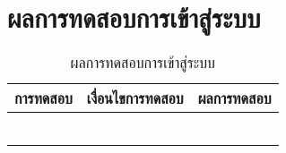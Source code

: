 \section{ผลการทดสอบการเข้าสู่ระบบ}
\begin{table}[H]
	\caption{ผลการทดสอบการเข้าสู่ระบบ}
    \centering	
	\label{tab:test2}
    \begin{tabular}{ | p{4cm} | p{4cm} | p{4cm} |  }
		\hline
	\multicolumn{1}{|c|}{การทดสอบ} & \multicolumn{1}{c|}{เงื่อนไขการทดสอบ} & \multicolumn{1}{c|}{ผลการทดสอบ} \\ \hline
	\setstretch{1.0}{ทดสอบการเข้าสู่ระบบ}
	& \setstretch{1.0}{ผู้ใช้เข้ามาในหน้าเข้าสู่ระบบ}
	& \setstretch{1.0}{ระบบแสดงหน้าเข้าสู่ระบบ} \\ \cline{2-3} 
	& \setstretch{1.0}{ผู้ใช้กดปุ่มเข้าสู่ระบบ โดยไม่กรอก username และ password } 
	& \setstretch{1.0}{ระบบแสดงข้อความบอกผู้ใช้ว่า  กรุณากรอกชื่อผู้ใช้หรือรหัสผ่านให้ถูกต้อง } \\ \cline{2-3} 
	& \setstretch{1.0}{ผู้ใช้กดเข้าสู่ระบบโดยกรอก username ไม่ถูกต้อง}  
	& \setstretch{1.0}{ระบบแสดงข้อความบอกผู้ใช้ว่า  กรุณากรอกชื่อผู้ใช้หรือรหัสผ่านให้ถูกต้อง } \\ \cline{2-3} 
	& \setstretch{1.0}{ผู้ใช้กดเข้าสู่ระบบโดยกรอก username ถูกต้องแต่กรอก password ไม่ถูกต้อง} 
	& \setstretch{1.0}{ระบบแสดงข้อความบอกผู้ใช้ว่า  กรุณากรอกชื่อผู้ใช้หรือรหัสผ่านให้ถูกต้อง } \\ \cline{2-3}
	& \setstretch{1.0}{ผู้ใช้กดเข้าสู่ระบบโดยกรอก username และ password ถูกต้องและมีชื่อเล่น รูปประจำตัว อายุ เบอร์โทรศัพท์} 
	& \setstretch{1.0}{ระบบแสดงข้อความบอกผู้ใช้ว่า  เข้าสู่ระบบสำเร็จ  และจะแสดงชื่อผู้ใช้และรูปโปรไฟล์ที่แถบบนด้านขวา} \\ \cline{2-3}
	& \setstretch{1.0}{ผู้ใช้กดเข้าสู่ระบบโดยกรอก username และ password ถูกต้องและไม่มีมีชื่อเล่น รูปประจำตัว อายุ เบอร์โทรศัพท์} 
	& \setstretch{1.0}{ระบบแสดงข้อความบอกผู้ใช้ว่า  เข้าสู่ระบบสำเร็จ  และแสดงหน้าให้เพิ่มรูปประจำตัว} \\ \hline
    \end{tabular}
\end{table}

